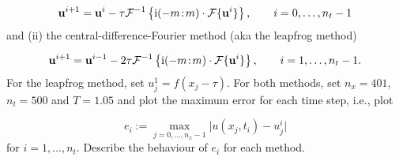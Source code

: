 \documentclass[12pt,a4paper]{article}
\begin{document}
\[
\mathbf{u}^{i+1} = \mathbf{u}^{i} - \tau \mathcal{F}^{-1}\left\lbrace {\rm i}(-m\!:\!m)\cdot\mathcal{F}\lbrace \mathbf{u}^{i} \rbrace\right\rbrace, \qquad i = 0, \ldots, n_t-1
\]
and (ii) the central-difference-Fourier method (aka the leapfrog method)

\[
\mathbf{u}^{i+1} = \mathbf{u}^{i-1} - 2\tau \mathcal{F}^{-1}\left\lbrace {\rm i}(-m\!:\!m)\cdot\mathcal{F}\lbrace \mathbf{u}^{i} \rbrace\right\rbrace, \qquad i = 1, \ldots, n_t-1.
\]
For the leapfrog method, set $u^{1}_{j} = f(x_j - \tau)$.     For both methods, set $n_x = 401$, $n_t = 500$ and $T = 1.05$ and plot the maximum error for each time step, i.e., plot

\[
   e_i := \max_{j = 0, \ldots, n_x-1} \vert u(x_j,t_i) - u^i_j \vert
\]
for $i = 1, \ldots, n_t$.  Describe the behaviour of $e_i$ for each method.
\end{document}
